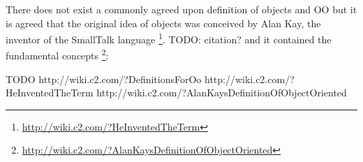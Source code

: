 \medskip


There does not exist a commonly agreed upon definition of objects and OO but it is agreed that the original idea of objects was conceived by Alan Kay, the inventor of the SmallTalk language \footnote{\url{http://wiki.c2.com/?HeInventedTheTerm}}. TODO: citation? and it contained the fundamental concepts \footnote{\url{http://wiki.c2.com/?AlanKaysDefinitionOfObjectOriented}}:

TODO
http://wiki.c2.com/?DefinitionsForOo
http://wiki.c2.com/?HeInventedTheTerm
http://wiki.c2.com/?AlanKaysDefinitionOfObjectOriented



